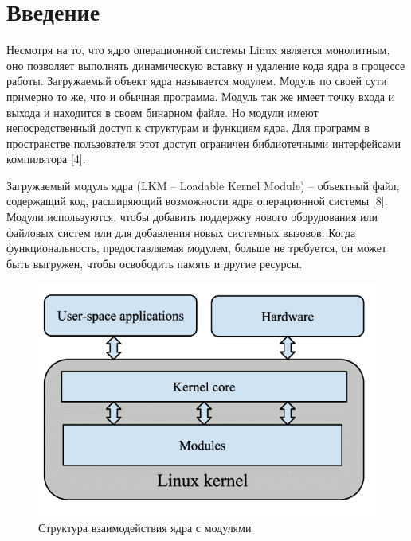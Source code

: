 





\tableofcontents
\newpage




\section{Введение}

Несмотря на то, что ядро операционной системы Linux является монолитным, оно позволяет выполнять динамическую вставку и удаление кода ядра в процессе работы. Загружаемый объект ядра называется модулем. Модуль по своей сути примерно то же, что и обычная программа. Модуль так же имеет точку входа и выхода и находится в своем бинарном файле. Но модули имеют непосредственный доступ к структурам и функциям ядра. Для программ в пространстве пользователя этот доступ ограничен библиотечными интерфейсами компилятора [4].

Загружаемый модуль ядра (LKM -- Loadable Kernel Module) -- объектный файл, содержащий код, расширяющий возможности ядра операционной системы [8]. Модули используются, чтобы добавить поддержку нового оборудования или файловых систем или для добавления новых системных вызовов. Когда функциональность, предоставляемая модулем, больше не требуется, он может быть выгружен, чтобы освободить память и другие ресурсы.

\begin{figure}[H]
	\centering
	\includegraphics[width=0.6\linewidth]{module}
	\caption{Структура взаимодействия ядра с модулями}
\end{figure}

